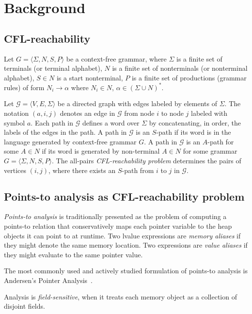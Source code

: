 \section{Background}
\label{sec:background}
\subsection{CFL-reachability}
Let  $G =\langle\Sigma, N, S, P\rangle$ be a context-free grammar, where $\Sigma$ is a finite set of terminals (or terminal alphabet), $N$ is a finite set of nonterminals (or nonterminal alphabet), $S \in N$ is a start nonterminal, $P$ is a finite set of productions (grammar rules) of form $N_i \to \alpha$ where  $N_i \in N$, $\alpha \in (\Sigma \cup N)^*$.

Let $\mathcal{G} =  \langle V, E, \Sigma \rangle$ be a directed graph with edges labeled by elements of $\Sigma$.  The notation $(a, i, j)$ denotes an edge in $\mathcal{G}$ from node $i$ to node $j$ labeled with symbol $a$.  Each path in $\mathcal{G}$ defines a word over $\Sigma$ by concatenating, in order, the labels of the edges in the path. A path in $\mathcal{G}$ is an $S$-path if its word is in the language generated by context-free grammar $G$.  A path in $\mathcal{G}$ is an $A$-path for some $A \in N$ if its word is generated by non-terminal $A \in N$ for some grammar $G =\langle\Sigma, N, S, P\rangle$. The all-pairs \textit{CFL-reachability problem} determines the pairs of vertices $(i, j)$, where there exists an $S$-path from $i$ to $j$ in $\mathcal{G}$.



\subsection{Points-to analysis as CFL-reachability problem}
\textit{Points-to analysis} is traditionally presented as the problem of computing a points-to relation that conservatively maps each pointer variable to the heap objects it can point to at runtime. 
Two lvalue expressions are \textit{memory aliases} if they might denote the same memory location. 
Two expressions are \textit{value aliases} if they might evaluate to the same pointer value. 

The most commonly used and actively studied formulation of points-to analysis is Andersen's Pointer Analysis~\cite{Andersen2005ProgramAA}.

Analysis is \textit{field-sensitive}, when it treats each memory object as a collection of disjoint fields.

